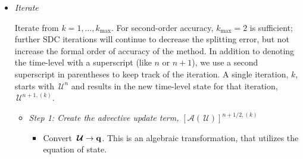 \documentclass[linenumbers]{aastex631}
\newcommand{\Ic}{{\boldsymbol{\mathcal{I}}}}
\newcommand{\kmax}{{k_\mathrm{max}}}
\newcommand{\Uc}{{\,\bm{\mathcal{U}}}}
\newcommand{\qb}{{\bf q}}
\newcommand{\Rb}{{\bf R}}
\newcommand{\Adv}[1]{{\left [\boldsymbol{\mathcal{A}} \left(#1\right)\right]}}
\begin{document}
\begin{itemize}








\item {\em Iterate}

  Iterate from $k = 1, \ldots, \kmax$.  For second-order accuracy,
  $\kmax = 2$ is sufficient; further SDC iterations will continue to decrease the splitting error,
  but not increase the formal order of accuracy of the method.  In addition to denoting the time-level
  with a superscript (like $n$ or $n+1$), we use a second superscript
  in parentheses to keep track of the iteration.  A single iteration, $k$,
  starts with $\Uc^n$ and results in the new time-level state for that
  iteration, $\Uc^{n+1,(k)}$.

  \begin{itemize}
  \item {\em Step 1: Create the advective update term, $\Adv{\Uc}^{n+1/2,(k)}$}

    \begin{itemize}
    \item Convert $\Uc \rightarrow \qb$.  This is an algebraic transformation,
      that utilizes the equation of state.


\end{itemize}
\end{itemize}
\end{itemize}
\end{document}
